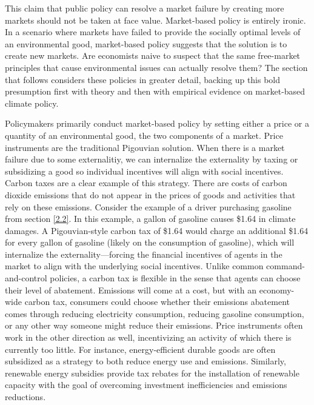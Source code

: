 This claim that public policy can resolve a market failure by creating more markets should not be taken at face value. Market-based policy is entirely ironic. In a scenario where markets have failed to provide the socially optimal levels of an environmental good, market-based policy suggests that the solution is to create new markets. Are economists naive to suspect that the same free-market principles that cause environmental issues can actually resolve them? The section that follows considers these policies in greater detail, backing up this bold presumption first with theory and then with empirical evidence on market-based climate policy. 

Policymakers primarily conduct market-based policy by setting either a price or a quantity of an environmental good, the two components of a market. Price instruments are the traditional Pigouvian solution. When there is a market failure due to some externalitiy, we can internalize the externality by taxing or subsidizing a good so individual incentives will align with social incentives. Carbon taxes are a clear example of this strategy. There are costs of carbon dioxide emissions that do not appear in the prices of goods and activities that rely on these emissions. Consider the example of a driver purchasing gasoline from section \ref{2.2}. In this example, a gallon of gasoline causes \$1.64 in climate damages. A Pigouvian-style carbon tax of \$1.64 would charge an additional \$1.64 for every gallon of gasoline (likely on the consumption of gasoline), which will internalize the externality---forcing the financial incentives of agents in the market to align with the underlying social incentives. Unlike common command-and-control policies, a carbon tax is flexible in the sense that agents can choose their level of abatement. Emissions will come at a cost, but with an economy-wide carbon tax, consumers could choose whether their emissions abatement comes through reducing electricity consumption, reducing gasoline consumption, or any other way someone might reduce their emissions. Price instruments often work in the other direction as well, incentivizing an activity of which there is currently too little. For instance, energy-efficient durable goods are often subsidized as a strategy to both reduce energy use and emissions. Similarly, renewable energy subsidies provide tax rebates for the installation of renewable capacity with the goal of overcoming investment inefficiencies and emissions reductions. 

